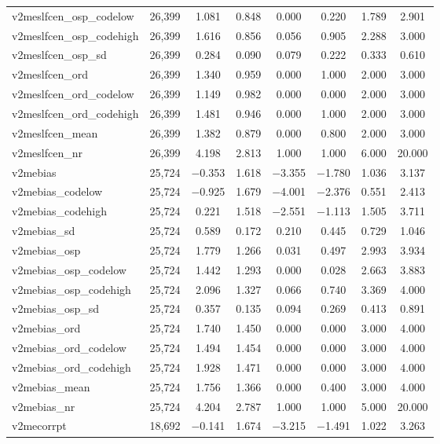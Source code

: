 \begin{table}[!htbp]
\begin{tabular}{@{\extracolsep{5pt}}lccccccc}
v2meslfcen\_osp\_codelow & 26,399 & 1.081 & 0.848 & 0.000 & 0.220 & 1.789 & 2.901 \\ 
v2meslfcen\_osp\_codehigh & 26,399 & 1.616 & 0.856 & 0.056 & 0.905 & 2.288 & 3.000 \\ 
v2meslfcen\_osp\_sd & 26,399 & 0.284 & 0.090 & 0.079 & 0.222 & 0.333 & 0.610 \\ 
v2meslfcen\_ord & 26,399 & 1.340 & 0.959 & 0.000 & 1.000 & 2.000 & 3.000 \\ 
v2meslfcen\_ord\_codelow & 26,399 & 1.149 & 0.982 & 0.000 & 0.000 & 2.000 & 3.000 \\ 
v2meslfcen\_ord\_codehigh & 26,399 & 1.481 & 0.946 & 0.000 & 1.000 & 2.000 & 3.000 \\ 
v2meslfcen\_mean & 26,399 & 1.382 & 0.879 & 0.000 & 0.800 & 2.000 & 3.000 \\ 
v2meslfcen\_nr & 26,399 & 4.198 & 2.813 & 1.000 & 1.000 & 6.000 & 20.000 \\ 
v2mebias & 25,724 & $-$0.353 & 1.618 & $-$3.355 & $-$1.780 & 1.036 & 3.137 \\ 
v2mebias\_codelow & 25,724 & $-$0.925 & 1.679 & $-$4.001 & $-$2.376 & 0.551 & 2.413 \\ 
v2mebias\_codehigh & 25,724 & 0.221 & 1.518 & $-$2.551 & $-$1.113 & 1.505 & 3.711 \\ 
v2mebias\_sd & 25,724 & 0.589 & 0.172 & 0.210 & 0.445 & 0.729 & 1.046 \\ 
v2mebias\_osp & 25,724 & 1.779 & 1.266 & 0.031 & 0.497 & 2.993 & 3.934 \\ 
v2mebias\_osp\_codelow & 25,724 & 1.442 & 1.293 & 0.000 & 0.028 & 2.663 & 3.883 \\ 
v2mebias\_osp\_codehigh & 25,724 & 2.096 & 1.327 & 0.066 & 0.740 & 3.369 & 4.000 \\ 
v2mebias\_osp\_sd & 25,724 & 0.357 & 0.135 & 0.094 & 0.269 & 0.413 & 0.891 \\ 
v2mebias\_ord & 25,724 & 1.740 & 1.450 & 0.000 & 0.000 & 3.000 & 4.000 \\ 
v2mebias\_ord\_codelow & 25,724 & 1.494 & 1.454 & 0.000 & 0.000 & 3.000 & 4.000 \\ 
v2mebias\_ord\_codehigh & 25,724 & 1.928 & 1.471 & 0.000 & 0.000 & 3.000 & 4.000 \\ 
v2mebias\_mean & 25,724 & 1.756 & 1.366 & 0.000 & 0.400 & 3.000 & 4.000 \\ 
v2mebias\_nr & 25,724 & 4.204 & 2.787 & 1.000 & 1.000 & 5.000 & 20.000 \\ 
v2mecorrpt & 18,692 & $-$0.141 & 1.674 & $-$3.215 & $-$1.491 & 1.022 & 3.263 \\ 

\end{tabular}
\end{table}
